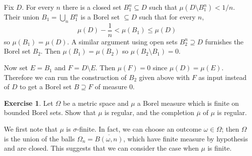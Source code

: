 \documentclass[10pt]{article}
\theoremstyle{definition}
\newtheorem{exer}{Exercise}
\begin{document}
Fix $D$. For every $n$ there is a closed set $B_1^n \subseteq D$ such that $\mu(D \setminus B_1^n) < 1/n$.
Their union $B_1 = \bigcup_n B_1^n$ is a Borel set $\subseteq D$ such that for every $n$,
$$\mu(D) - \frac{1}{n} < \mu(B_1) \leq \mu(D)$$
so $\mu(B_1) = \mu(D)$. A similar argument using open sets $B_2^n \supseteq D$ furnishes the Borel set $B_2$. Then $\mu(B_1) = \mu(B_2)$ so $\mu(B_2 \setminus B_1) = 0$.

Now set $E = B_1$ and $F = D \setminus E$. Then $\mu(F) = 0$ since $\mu(D) = \mu(E)$.
Therefore we can run the construction of $B_2$ given above with $F$ as input instead of $D$ to get a Borel set $B \supseteq F$ of measure $0$.

\begin{exer}
Let $\Omega$ be a metric space and $\mu$ a Borel measure which is finite on bounded Borel sets. Show that $\mu$ is regular, and the completion $\overline \mu$ of $\mu$ is regular.
\end{exer}

We first note that $\mu$ is $\sigma$-finite. In fact, we can choose an outcome $\omega \in \Omega$; then $\Omega$ is the union of the balls $\Omega_n =
\overline{B(\omega, n)}$, which have finite measure by hypothesis and are closed.
This suggests that we can consider the case when $\mu$ is finite.
\end{document}
